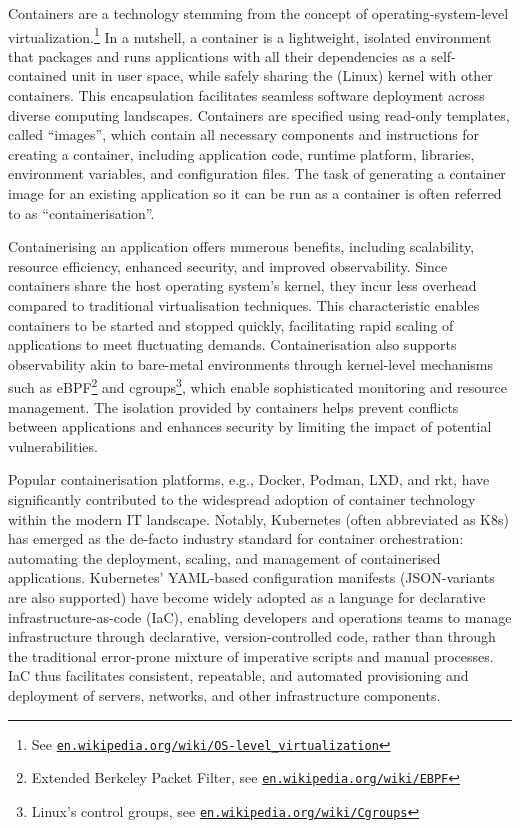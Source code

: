 \documentclass{easychair}
\begin{document}
Containers are a technology stemming from the concept of operating-system-level 
virtualization.\footnote{%
See \href{https://en.wikipedia.org/wiki/OS-level_virtualization}{\tt en.wikipedia.org/wiki/OS-level\_virtualization}}
In a nutshell, a container is a lightweight, isolated environment that packages and runs applications with all their dependencies as a self-contained unit in user space, while safely sharing the (Linux) kernel with other containers. This encapsulation facilitates seamless software deployment across diverse computing landscapes. 
Containers are specified using read-only templates, called ``images'', which contain all necessary components and instructions for creating a container, including application code, runtime platform, libraries, environment variables, and configuration files. The task of generating a container image for an existing application so it can be run as a container is often referred to as ``containerisation''.

Containerising an application offers numerous benefits, including scalability, resource efficiency, enhanced 
security, and improved observability. 
Since containers share the host operating system's kernel, they incur less overhead compared to 
traditional virtualisation techniques. 
This characteristic enables containers to be started and stopped quickly, facilitating rapid 
scaling of applications to meet fluctuating demands. 
Containerisation also supports observability akin to bare-metal environments through kernel-level 
mechanisms such as eBPF\footnote{%
Extended Berkeley Packet Filter, see \href{https://en.wikipedia.org/wiki/EBPF}{\tt en.wikipedia.org/wiki/EBPF}}
and cgroups\footnote{%
Linux's control groups, see \href{https://en.wikipedia.org/wiki/Cgroups}{\tt en.wikipedia.org/wiki/Cgroups}}, 
which enable sophisticated monitoring and resource management. 
The isolation provided by containers helps prevent conflicts between applications and enhances 
security by limiting the impact of potential vulnerabilities.

Popular containerisation platforms, e.g., Docker, Podman, LXD, and rkt, have significantly 
contributed to the widespread adoption of container technology within the modern IT landscape. 
Notably, Kubernetes (often abbreviated as K8s) has emerged as the de-facto industry standard for 
container orchestration: automating the deployment, scaling, and management of containerised 
applications. 
Kubernetes' YAML-based configuration manifests (JSON-variants are also supported) have become 
widely adopted as a language for  declarative infrastructure-as-code (IaC), enabling developers 
and operations teams to manage infrastructure through declarative, version-controlled code, 
rather than through the traditional error-prone mixture of imperative scripts and manual processes. 
IaC thus facilitates consistent, repeatable, and automated provisioning and deployment of servers, 
networks, and other infrastructure components.
\end{document}
